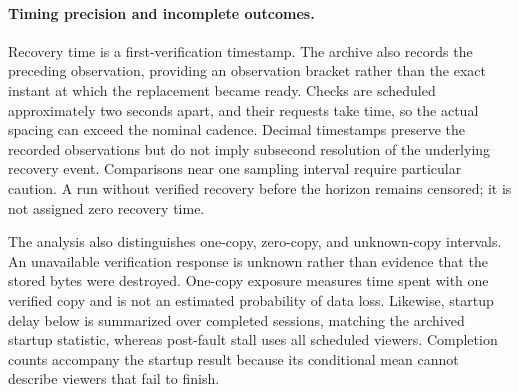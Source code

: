 \paragraph{Timing precision and incomplete outcomes.}
Recovery time is a first-verification timestamp. The archive also records
the preceding observation, providing an observation bracket rather than
the exact instant at which the replacement became ready. Checks are
scheduled approximately two seconds apart, and their requests take time,
so the actual spacing can exceed the nominal cadence. Decimal timestamps
preserve the recorded observations but do not imply subsecond resolution
of the underlying recovery event. Comparisons near one sampling interval
require particular caution. A run without verified recovery before the
horizon remains censored; it is not assigned zero recovery time.

The analysis also distinguishes one-copy, zero-copy, and unknown-copy
intervals. An unavailable verification response is unknown rather than
evidence that the stored bytes were destroyed. One-copy exposure measures
time spent with one verified copy and is not an estimated probability of
data loss. Likewise, startup delay below is summarized over completed
sessions, matching the archived startup statistic, whereas post-fault stall
uses all scheduled viewers. Completion counts accompany the startup result
because its conditional mean cannot describe viewers that fail to finish.

